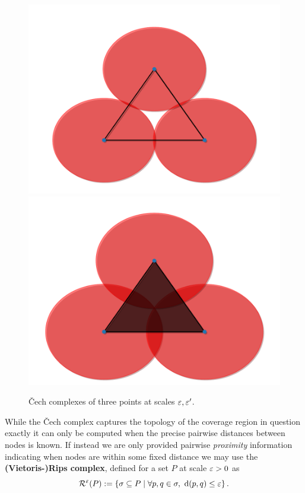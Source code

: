 \begin{figure}[htbp]
 \centering
     \includegraphics[scale=0.36]{figures/cech1.pdf}
     \includegraphics[scale=0.36]{figures/cech2.pdf}
     \caption{\v Cech complexes of three points at scales $\varepsilon, \varepsilon'$.}
     \label{fig:cech}
 \end{figure}

While the \v Cech complex captures the topology of the coverage region in question exactly it can only be computed when the precise pairwise distances between nodes is known.
If instead we are only provided pairwise \textit{proximity} information indicating when nodes are within some fixed distance we may use the \textbf{(Vietoris-)Rips complex}, defined for a set $P$ at scale $\varepsilon > 0$ as
\[ \mathcal{R}^\varepsilon(P) := \left\{\sigma \subseteq P\mid \forall p,q\in\sigma,\ \mathrm{d}(p, q)\leq\varepsilon\right\}. \]

